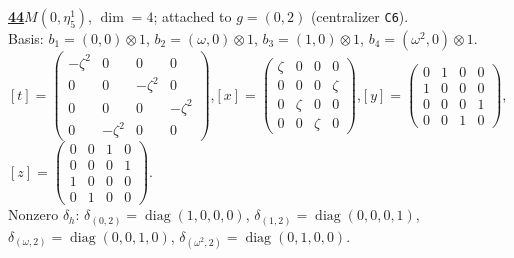 \begin{samepage}\noindent\textbf{\underline{44}}\quad $M(0,\eta^{1}_{5})$, $\dim=4$; attached to $g=(0,2)$ (centralizer \texttt{C6}).\\
Basis: $b_{1}=(0,0)\otimes 1$, $b_{2}=(\omega,0)\otimes 1$, $b_{3}=(1,0)\otimes 1$, $b_{4}=(\omega^2,0)\otimes 1$.\\
$[t]=\left(\begin{smallmatrix} -\zeta^2 & 0 & 0 & 0 \\ 0 & 0 & -\zeta^2 & 0 \\ 0 & 0 & 0 & -\zeta^2 \\ 0 & -\zeta^2 & 0 & 0 \end{smallmatrix}\right)$,\quad $[x]=\left(\begin{smallmatrix} \zeta & 0 & 0 & 0 \\ 0 & 0 & 0 & \zeta \\ 0 & \zeta & 0 & 0 \\ 0 & 0 & \zeta & 0 \end{smallmatrix}\right)$,\quad $[y]=\left(\begin{smallmatrix} 0 & 1 & 0 & 0 \\ 1 & 0 & 0 & 0 \\ 0 & 0 & 0 & 1 \\ 0 & 0 & 1 & 0 \end{smallmatrix}\right)$,\quad $[z]=\left(\begin{smallmatrix} 0 & 0 & 1 & 0 \\ 0 & 0 & 0 & 1 \\ 1 & 0 & 0 & 0 \\ 0 & 1 & 0 & 0 \end{smallmatrix}\right)$.\\
Nonzero $\delta_h$: $\delta_{(0,2)}=\operatorname{diag}(1,0,0,0)$, $\delta_{(1,2)}=\operatorname{diag}(0,0,0,1)$, $\delta_{(\omega,2)}=\operatorname{diag}(0,0,1,0)$, $\delta_{(\omega^2,2)}=\operatorname{diag}(0,1,0,0)$.\end{samepage}
\medskip

